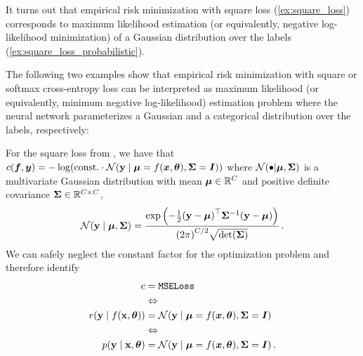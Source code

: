 It turns out that empirical risk minimization with square loss (\cref{ex:square_loss}) corresponds to maximum likelihood estimation (or equivalently, negative log-likelihood minimization) of a Gaussian distribution over the labels (\cref{ex:square_loss_probabilistic}).

The following two examples show that empirical risk minimization with square  or softmax cross-entropy loss can be interpreted as maximum likelihood (or equivalently, minimum negative log-likelihood) estimation problem where the neural network parameterizes a Gaussian and a categorical distribution over the labels, respectively:

\switchcolumn[1]
\begin{example}\label{ex:square_loss_probabilistic}
  For the square loss from , we have that $c({\bm{f}}, {\bm{y}}) = - \log( \mathrm{const.}
  \cdot {\mathcal{N}}({\mathbf{y}} \mid {\bm{\mu}} = f({\bm{x}}, {\bm{\theta}}), {\bm{\Sigma}} = {\bm{I}}))$ where ${\mathcal{N}}(\bullet | {\bm{\mu}}, {\bm{\Sigma}})$ is a multivariate Gaussian distribution with mean ${\bm{\mu}} \in {\mathbb{R}}^C$ and positive definite covariance ${\bm{\Sigma}} \in {\mathbb{R}}^{C \times C}$,
  \begin{align*}
    {\mathcal{N}}({\mathbf{y}} \mid {\bm{\mu}}, {\bm{\Sigma}})
    =
    \frac{
    \exp\left( -\frac{1}{2} {({\mathbf{y}} - {\bm{\mu}})}^\top {\bm{\Sigma}}^{-1} ({\mathbf{y}} - {\bm{\mu}}) \right)
    }{{(2\pi)}^{C/2} \sqrt{\det({\bm{\Sigma}})}}\,.
  \end{align*}
  We can safely neglect the constant factor for the optimization problem and therefore identify
  \begin{align*}
    c                             & = \text{\texttt{MSELoss}}
    \\
                                  & \Leftrightarrow
    \\
    r({\mathbf{y}} \mid f({\mathbf{x}}, {\bm{\theta}})) & = {\mathcal{N}}({\mathbf{y}} \mid {\bm{\mu}} = f({\bm{x}}, {\bm{\theta}}), {\bm{\Sigma}} = {\bm{I}})\,
    \\
                                  & \Leftrightarrow
    \\
    p({\mathbf{y}} \mid {\mathbf{x}}, {\bm{\theta}})    & = {\mathcal{N}}({\mathbf{y}} \mid {\bm{\mu}} = f({\bm{x}}, {\bm{\theta}}), {\bm{\Sigma}} = {\bm{I}})\,.
  \end{align*}
\end{example}

